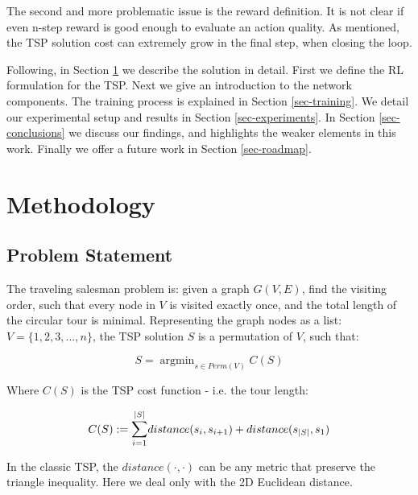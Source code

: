 \documentclass[10pt,a4paper,draft]{article}
\DeclareMathOperator*{\argmin}{argmin}
\begin{document}
The second and more problematic issue is the reward definition. It is not clear if even n-step reward is good enough to evaluate an action quality. As mentioned, the TSP solution cost can extremely grow in the final step, when closing the loop.

Following, in Section \ref{sec-methodology} we describe the solution in detail. First we define the RL formulation for the TSP. Next we give an introduction to the network components. The training process is explained in Section \ref{sec-training}. We detail our experimental setup and results in Section \ref{sec-experiments}. In Section \ref{sec-conclusions} we discuss our findings, and highlights the weaker elements in this work. Finally we offer a future work in Section \ref{sec-roadmap}.

\section{Methodology} \label{sec-methodology}
\subsection{Problem Statement}
The traveling salesman problem is: given a graph $G(V,E)$, find the visiting order, such that every node in $V$ is visited exactly once, and the total length of the circular tour is minimal. Representing the graph nodes as a list: $V = \{1,2,3,...,n\}$, the TSP solution $S$ is a permutation of $V$, such that:

\begin{equation} \label{tsp_statement}
	S = \argmin_{s \in Perm(V)} C(S)
\end{equation}

Where $C(S)$ is the TSP cost function - i.e. the tour length:

\begin{equation}  \label{tsp_cost}
	C(S) := \mathlarger{\sum}_{i=1}^{|S|}{distance(s_i, s_{i+1})} + distance(s_{|S|}, s_1)
\end{equation}

In the classic TSP, the $distance(\cdot,\cdot)$ can be any metric that preserve the triangle inequality. Here we deal only with the 2D Euclidean distance. 
\end{document}
